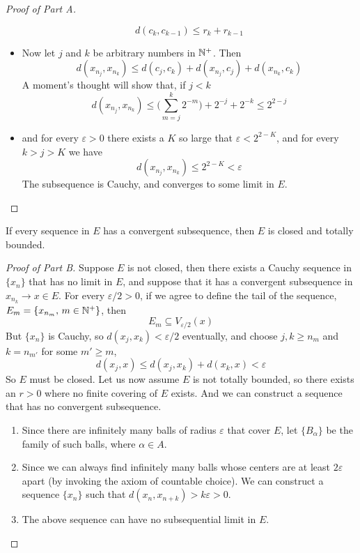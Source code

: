 \documentclass[../../main.tex]{subfiles}
\begin{document}
\begin{proof}[Proof of Part A]
\begin{itemize}
        \[
        d(c_k,c_{k-1})\leq r_k + r_{k-1}
        \]
        \item Now let $j$ and $k$ be arbitrary numbers in $\mathbb{N}^+$. Then
        \[
        d(x_{n_j},x_{n_k})\leq d(c_{j},c_{k}) + d(x_{n_j}, c_j) + d(x_{n_k}, c_k)
        \]
        A moment's thought will show that, if $j<k$
        \[
        d(x_{n_j},x_{n_k})\leq \biggl(\sum_{m=j}^k2^{-m}\biggr) + 2^{-j} + 2^{-k}\leq 2^{2-j}
        \]
        \item and for every $\varepsilon>0$ there exists a $K$ so large that $\varepsilon<2^{2-K}$, and for every $k>j>K$ we have
        \[
        d(x_{n_j}, x_{n_k})\leq 2^{2-K}<\varepsilon
        \]
        The subsequence is Cauchy, and converges to some limit in $E$.
    \end{itemize}
\end{proof}
\begin{wts}
    If every sequence in $E$ has a convergent subsequence, then $E$ is closed and totally bounded.
\end{wts}
\begin{proof}[Proof of Part B]
    Suppose $E$ is not closed, then there exists a Cauchy sequence in $\{x_n\}$ that has no limit in $E$, and suppose that it has a convergent subsequence in $x_{n_k}\to x\in E$. For every $\varepsilon/2>0$, if we agree to define the tail of the sequence, $E_m = \{x_{n_m},\, m\in \mathbb{N}^+\}$, then 
    \[
    E_m\subseteq V_{\varepsilon/2}(x)
    \]
    But $\{x_n\}$ is Cauchy, so $d(x_j,x_k)<\varepsilon/2$ eventually, and choose $j,k\geq n_m$ and $k=n_{m'}$ for some $m'\geq m$,
    \[
    d(x_j, x)\leq d(x_j,x_k) +d(x_k,x) <\varepsilon
    \]
    So $E$ must be closed. Let us now assume $E$ is not totally bounded, so there exists an $r>0$ where no finite covering of $E$ exists. And we can construct a sequence that has no convergent subsequence.
    \begin{enumerate}
        \item Since there are infinitely many balls of radius $\varepsilon$ that cover $E$, let $\{B_\alpha\}$ be the family of such balls, where $\alpha\in A$.
        \item Since we can always find infinitely many balls whose centers are at least $2\varepsilon$ apart (by invoking the axiom of countable choice). We can construct a sequence $\{x_n\}$ such that $d(x_n,x_{n+k})>k\varepsilon>0$.
        \item The above sequence can have no subsequential limit in $E$.
    \end{enumerate}
\end{proof}
\end{document}
